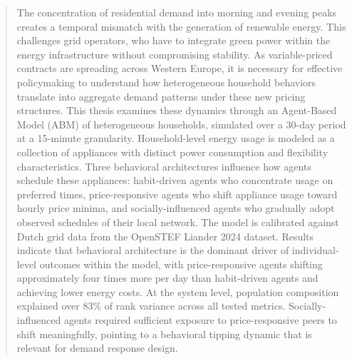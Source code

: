 \documentclass[11pt, a4paper]{article}
\begin{document}


\begin{abstract}
The concentration of residential demand into morning and evening peaks creates a temporal mismatch with the generation of renewable energy. This challenges grid operators, who have to integrate green power within the energy infrastructure without compromising stability. As variable-priced contracts are spreading across Western Europe, it is necessary for effective policymaking to understand how heterogeneous household behaviors translate into aggregate demand patterns under these new pricing structures. This thesis examines these dynamics through an Agent-Based Model (ABM) of heterogeneous households, simulated over a 30-day period at a 15-minute granularity. Household-level energy usage is modeled as a collection of appliances with distinct power consumption and flexibility characteristics. Three behavioral architectures influence how agents schedule these appliances: habit-driven agents who concentrate usage on preferred times, price-responsive agents who shift appliance usage toward hourly price minima, and socially-influenced agents who gradually adopt observed schedules of their local network. The model is calibrated against Dutch grid data from the OpenSTEF Liander 2024 dataset. Results indicate that behavioral architecture is the dominant driver of individual-level outcomes within the model, with price-responsive agents shifting approximately four times more per day than habit-driven agents and achieving lower energy costs. At the system level, population composition explained over 83\% of rank variance across all tested metrics. Socially-influenced agents required sufficient exposure to price-responsive peers to shift meaningfully, pointing to a behavioral tipping dynamic that is relevant for demand response design.
\end{abstract}
\pagebreak
\end{document}
